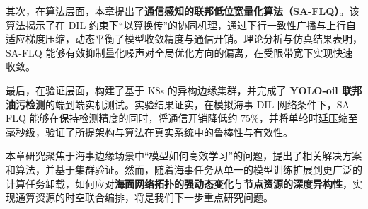 其次，在算法层面，本章提出了\textbf{通信感知的联邦低位宽量化算法（SA-FLQ）}。该算法揭示了在 DIL 约束下“以算换传”的协同机理，通过下行一致性广播与上行自适应梯度压缩，动态平衡了模型收敛精度与通信开销。理论分析与仿真结果表明，SA\mbox{-}FLQ 能够有效抑制量化噪声对全局优化方向的偏离，在受限带宽下实现快速收敛。

最后，在验证层面，构建了基于 K8s 的异构边缘集群，并完成了 \textbf{YOLO-oil 联邦油污检测}的端到端实机测试。实验结果证实，在模拟海事 DIL 网络条件下，SA\mbox{-}FLQ 能够在保持检测精度的同时，将通信开销降低约 75\%，并将单轮时延压缩至毫秒级，验证了所提架构与算法在真实系统中的鲁棒性与有效性。

本章研究聚焦于海事边缘场景中“模型如何高效学习”的问题，提出了相关解决方案和算法，并基于集群验证。然而，随着海事任务从单一的模型训练扩展到更广泛的计算任务卸载，如何应对\textbf{海面网络拓扑的强动态变化}与\textbf{节点资源的深度异构性}，实现通算资源的时空联合编排，将是我们下一步重点研究问题。

